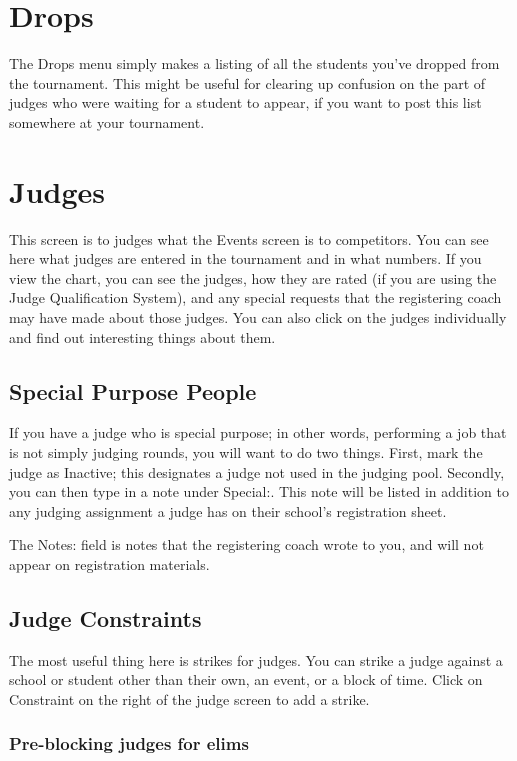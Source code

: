 \documentclass[12pt]{report} \usepackage {fullpage} \usepackage{times}
\begin{document}
\section{Drops}

The Drops menu simply makes a listing of all the students you've dropped
from the tournament.   This might be useful for clearing up confusion on
the part of judges who were waiting for a student to appear, if you want to
post this list somewhere at your tournament. 

\section{Judges}

This screen is to judges what the Events screen is to competitors.  You can
see here what judges are entered in the tournament and in what numbers.  If
you view the chart, you can see the judges, how they are rated (if you are
using the Judge Qualification System), and any special requests that the
registering coach may have made about those judges.    You can also click
on the judges individually and find out interesting things about them.  

\subsection{Special Purpose People} If you have a judge who is special
purpose; in other words, performing a job that is not simply judging
rounds, you will want to do two things.  First, mark the judge as Inactive;
this designates a judge not used in the judging pool.  Secondly, you can
then type in a note under Special:.  This note will be listed in addition
to any judging assignment a judge has on their school's registration sheet.    

The Notes: field is notes that the registering coach wrote to you, and will
not appear on registration materials. 

\subsection{Judge Constraints}

The most useful thing here is strikes for judges.   You can strike a
judge against a school or student other than their own, an event, or a
block of time.   Click on Constraint on the right of the judge screen to
add a strike.

\subsubsection{Pre-blocking judges for elims}
 
\end{document}
